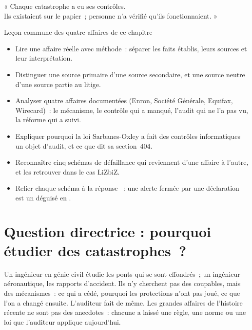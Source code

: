 \epigraph{%
    « Chaque catastrophe a eu ses contrôles.\\
    Ils existaient sur le papier~; personne n'a vérifié qu'ils fonctionnaient. »%
}{Leçon commune des quatre affaires de ce chapitre}


\begin{boxobjectifs}
\begin{itemize}
    \item Lire une affaire réelle avec méthode~: séparer les faits établis,
          leurs sources et leur interprétation.
    \item Distinguer une source primaire d'une source secondaire, et une
          source neutre d'une source partie au litige.
    \item Analyser quatre affaires documentées (Enron, Société Générale,
          Equifax, Wirecard)~: le mécanisme, le contrôle qui a manqué,
          l'audit qui ne l'a pas vu, la réforme qui a suivi.
    \item Expliquer pourquoi la loi Sarbanes-Oxley a fait des contrôles
          informatiques un objet d'audit, et ce que dit sa section~404.
    \item Reconnaître cinq schémas de défaillance qui reviennent d'une
          affaire à l'autre, et les retrouver dans le cas LiZbiZ.
    \item Relier chaque schéma à la réponse \NEK{}~: une alerte fermée par
          une déclaration est un \NEK{} déguisé en \OUI{}.
\end{itemize}
\end{boxobjectifs}

\bigskip

\section*{Question directrice : pourquoi étudier des catastrophes~?}

Un ingénieur en génie civil étudie les ponts qui se sont effondrés~; un
ingénieur aéronautique, les rapports d'accident. Ils n'y cherchent pas
des coupables, mais des mécanismes~: ce qui a cédé, pourquoi les
protections n'ont pas joué, ce que l'on a changé ensuite. L'auditeur fait
de même. Les grandes affaires de l'histoire récente ne sont pas des
anecdotes~: chacune a laissé une règle, une norme ou une loi que l'auditeur
applique aujourd'hui.

